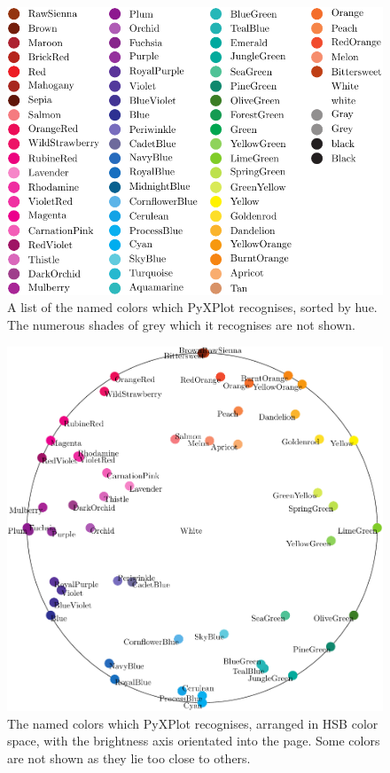 \begin{figure}
\begin{center}
\includegraphics[width=\textwidth]{figures/pyx_colors3}
\end{center}
\caption[A list of the named colors which PyXPlot recognises, sorted by hue]
{A list of the named colors which PyXPlot recognises, sorted by hue. The numerous shades of grey which it recognises are not shown.}
\label{fig:color_table2}
\end{figure}

\begin{figure}
\begin{center}
\includegraphics[width=\textwidth]{figures/pyx_colors}
\end{center}
\caption[The named colors which PyXPlot recognises, arranged in HSB color space]
{The named colors which PyXPlot recognises, arranged in HSB color space, with the brightness axis orientated into the page. Some colors are not shown as they lie too close to others.}
\label{fig:color_table3}
\end{figure}

